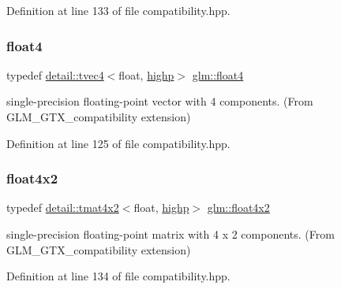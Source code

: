 Definition at line 133 of file compatibility.\+hpp.

\mbox{\label{group__gtx__compatibility_gac0676d140051809309ca683c325bf439}} 
\subsubsection{\texorpdfstring{float4}{float4}}
{\footnotesize\ttfamily typedef \hyperlink{structglm_1_1detail_1_1tvec4}{detail\+::tvec4}$<$float, \hyperlink{namespaceglm_a0f04f086094c747d227af4425893f545ac6f7eab42eacbb10d59a58e95e362074}{highp}$>$ \hyperlink{group__gtx__compatibility_gac0676d140051809309ca683c325bf439}{glm\+::float4}}



single-\/precision floating-\/point vector with 4 components. (From G\+L\+M\+\_\+\+G\+T\+X\+\_\+compatibility extension) 



Definition at line 125 of file compatibility.\+hpp.

\mbox{\label{group__gtx__compatibility_gab805aa2d6bbd5edddf78bd2e9322e6c7}} 
\subsubsection{\texorpdfstring{float4x2}{float4x2}}
{\footnotesize\ttfamily typedef \hyperlink{structglm_1_1detail_1_1tmat4x2}{detail\+::tmat4x2}$<$float, \hyperlink{namespaceglm_a0f04f086094c747d227af4425893f545ac6f7eab42eacbb10d59a58e95e362074}{highp}$>$ \hyperlink{group__gtx__compatibility_gab805aa2d6bbd5edddf78bd2e9322e6c7}{glm\+::float4x2}}



single-\/precision floating-\/point matrix with 4 x 2 components. (From G\+L\+M\+\_\+\+G\+T\+X\+\_\+compatibility extension) 



Definition at line 134 of file compatibility.\+hpp.

